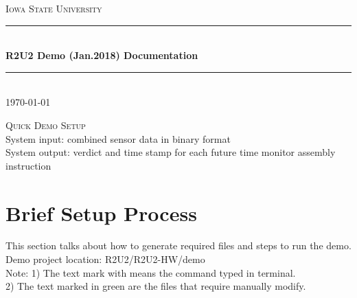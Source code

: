 \documentclass{article}
\theoremstyle{definition}
\begin{document}
\begin{titlepage}
	\newcommand{\HRule}{\rule{\linewidth}{0.5mm}}
	\center %
	\textsc{\LARGE Iowa State University}\\[1.5cm]
	\HRule\\[0.4cm]
	{\huge\bfseries R2U2 Demo (Jan.2018) Documentation}\\[0.4cm]
	\HRule\\[1.5cm]
	\vfill\vfill\vfill
	{\large\today}
	\vfill
\end{titlepage}

\begin{titlepage}
	\newcommand{\HRule}{\rule{\linewidth}{0.5mm}}
	\center %
	\textsc{\LARGE Quick Demo Setup}\\[1.5cm]
	System input: combined sensor data in binary format\\
	System output: verdict and time stamp for each future time monitor assembly instruction
\end{titlepage}

\section{Brief Setup Process}
This section talks about how to generate required files and steps to run the demo. \\
Demo project location: R2U2/R2U2-HW/demo\\
Note: 1) The text mark with \colorbox{blue!30}{\hspace{0.5cm}} means the command typed in terminal.\\
2) The text marked in \textcolor{green!100}{green} are the files that require manually modify.
\end{document}
